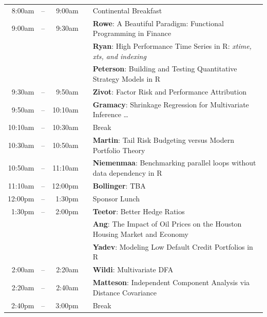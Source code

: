 \documentclass[11pt]{article}
\newcommand{\mylinecolor}[1]{\color{#1}\vspace{-8pt}}  %
\begin{document}
\begin{tabular}{rlrlp{5in}}
  8:00am  & -- &  9:00am &   & \small{\mylinecolor{Breaks} Continental Breakfast}  \\
   9:00am & -- &  9:30am &   & \textbf{\color{LightningTalk} Rowe}: \small{A Beautiful Paradigm: Functional Programming in Finance} \\
          &    &         &   & \textbf{\color{LightningTalk} Ryan}: \small{High Performance Time Series in R: \emph{xtime, xts, and indexing}} \\
          &    &         &   & \textbf{\color{LightningTalk} Peterson}: \small{Building and Testing Quantitative Strategy Models in R} \\
  9:30am  & -- &  9:50am &   & \textbf{\color{Talk} Zivot}: \small{Factor Risk and Performance Attribution} \\
  9:50am  & -- &  10:10am &   & \textbf{\color{Talk} Gramacy}: \small{Shrinkage Regression for Multivariate Inference \ldots} \\ %
  10:10am & -- & 10:30am &   & \small{\mylinecolor{Breaks}  Break}  \\
  10:30am  & -- &  10:50am &   & \textbf{\color{Talk} Martin}: \small{Tail Risk Budgeting versus Modern Portfolio Theory} \\
  10:50am  & -- &  11:10am &   & \textbf{\color{Talk} Niemenmaa}: \small{Benchmarking parallel loops without data dependency in R} \\
  11:10am & -- & 12:00pm &   & \textbf{\color{KeynoteTalk} Bollinger}: \small{TBA} \\
  12:00pm & -- &  1:30pm &   & \small{\mylinecolor{Breaks}  Sponsor Lunch}  \\
   1:30pm & -- &  2:00pm &   & \textbf{\color{LightningTalk} Teetor}: \small{Better Hedge Ratios} \\
          &    &         &   & \textbf{\color{LightningTalk} Ang}: \small{The Impact of Oil Prices on the Houston Housing Market and Economy} \\
          &    &         &   & \textbf{\color{LightningTalk} Yadev}: \small{Modeling Low Default Credit Portfolios in R} \\
  2:00am  & -- &  2:20am &   & \textbf{\color{Talk} Wildi}: \small{Multivariate DFA} \\
  2:20am  & -- &  2:40am &   & \textbf{\color{Talk} Matteson}: \small{Independent Component Analysis via Distance Covariance} \\
   2:40pm & -- & 3:00pm  &   & \small{\mylinecolor{Breaks} Break} \\

\end{tabular}
\end{document}
